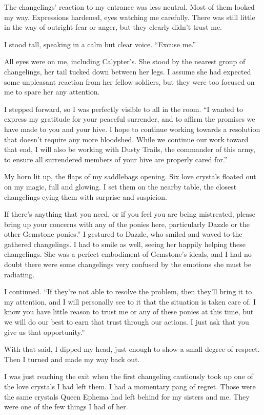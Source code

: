 The changelings’ reaction to my entrance was less neutral. Most of them looked my way. Expressions hardened, eyes watching me carefully. There was still little in the way of outright fear or anger, but they clearly didn’t trust me.

I stood tall, speaking in a calm but clear voice. “Excuse me.”

All eyes were on me, including Calypter’s. She stood by the nearest group of changelings, her tail tucked down between her legs. I assume she had expected some unpleasant reaction from her fellow soldiers, but they were too focused on me to spare her any attention.

I stepped forward, so I was perfectly visible to all in the room. “I wanted to express my gratitude for your peaceful surrender, and to affirm the promises we have made to you and your hive. I hope to continue working towards a resolution that doesn’t require any more bloodshed. While we continue our work toward that end, I will also be working with Dusty Trails, the commander of this army, to ensure all surrendered members of your hive are properly cared for.”

My horn lit up, the flaps of my saddlebags opening. Six love crystals floated out on my magic, full and glowing. I set them on the nearby table, the closest changelings eying them with surprise and suspicion.

\leavevmode{}If there’s anything that you need, or if you feel you are being mistreated, please bring up your concerns with any of the ponies here, particularly Dazzle or the other Gemstone ponies.” I gestured to Dazzle, who smiled and waved to the gathered changelings. I had to smile as well, seeing her happily helping these changelings. She was a perfect embodiment of Gemstone’s ideals, and I had no doubt there were some changelings very confused by the emotions she must be radiating.

I continued. “If they’re not able to resolve the problem, then they’ll bring it to my attention, and I will personally see to it that the situation is taken care of. I know you have little reason to trust me or any of these ponies at this time, but we will do our best to earn that trust through our actions. I just ask that you give us that opportunity.”

With that said, I dipped my head, just enough to show a small degree of respect. Then I turned and made my way back out.

I was just reaching the exit when the first changeling cautiously took up one of the love crystals I had left them. I had a momentary pang of regret. Those were the same crystals Queen Ephema had left behind for my sisters and me. They were one of the few things I had of her.

